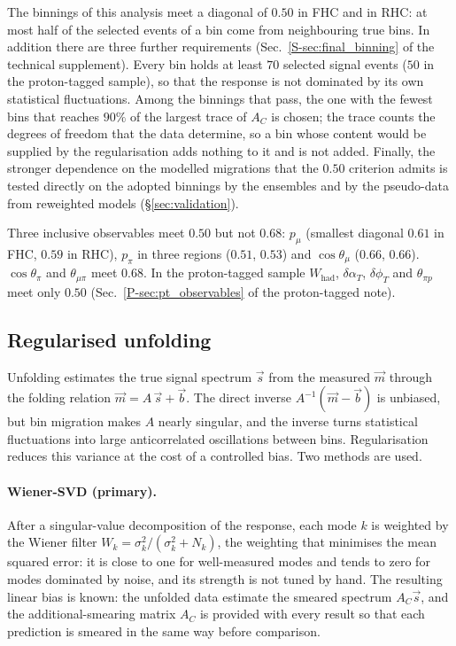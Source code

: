 \documentclass[11pt,a4paper]{article}
\newcommand{\suppref}[2]{#1~\ref{S-#2} of the technical supplement}
\newcommand{\ptref}[2]{#1~\ref{P-#2} of the proton-tagged note}
\begin{document}
The binnings of this analysis meet a diagonal of $0.50$ in FHC and in RHC: at most half of the selected
events of a bin come from neighbouring true bins. In addition there are three further requirements (\suppref{Sec.}{sec:final_binning}). Every bin holds at least $70$ selected  signal events ($50$ in
the proton-tagged sample), so that the response is not dominated by its own statistical fluctuations.
Among the binnings that pass, the one with the fewest bins that reaches $90\%$ of the largest trace of
$A_C$ is chosen; the trace counts the degrees of freedom that the data determine, so a bin whose
content would be supplied by the regularisation adds nothing to it and is not added. Finally, the
stronger dependence on the modelled migrations that the $0.50$ criterion admits is tested directly on
the adopted binnings by the ensembles and by the pseudo-data from reweighted models
(\S\ref{sec:validation}).

Three inclusive observables meet $0.50$ but not $0.68$: $p_\mu$ (smallest diagonal $0.61$ in FHC,
$0.59$ in RHC), $p_\pi$ in three regions ($0.51$, $0.53$) and $\cos\theta_\mu$ ($0.66$, $0.66$).
$\cos\theta_\pi$ and $\theta_{\mu\pi}$ meet $0.68$. In the proton-tagged sample $W_\mathrm{had}$, $\delta\alpha_T$,
$\delta\phi_T$ and $\theta_{\pi p}$ meet only $0.50$ (\ptref{Sec.}{sec:pt_observables}).

\subsection{Regularised unfolding}
\label{sec:unfmethods}

Unfolding estimates the true signal spectrum $\vec{s}$ from the measured $\vec{m}$ through the
folding relation $\vec{m} = A\,\vec{s} + \vec{b}$. The direct inverse $A^{-1}(\vec{m}-\vec{b})$ is
unbiased, but bin migration makes $A$ nearly singular, and the inverse turns statistical
fluctuations into large anticorrelated oscillations between bins. Regularisation reduces this
variance at the cost of a controlled bias. Two methods are used.

\paragraph{Wiener-SVD (primary).} After a singular-value decomposition of the response, each mode
$k$ is weighted by the Wiener filter $W_k=\sigma_k^2/(\sigma_k^2+N_k)$, the weighting that minimises
the mean squared error: it is close to one for well-measured modes and tends to zero for modes
dominated by noise, and its strength is not tuned by hand. The resulting linear bias is known: the
unfolded data estimate the smeared spectrum $A_C\vec{s}$, and the additional-smearing matrix $A_C$
is provided with every result so that each prediction is smeared in the same way before
comparison.
\end{document}
